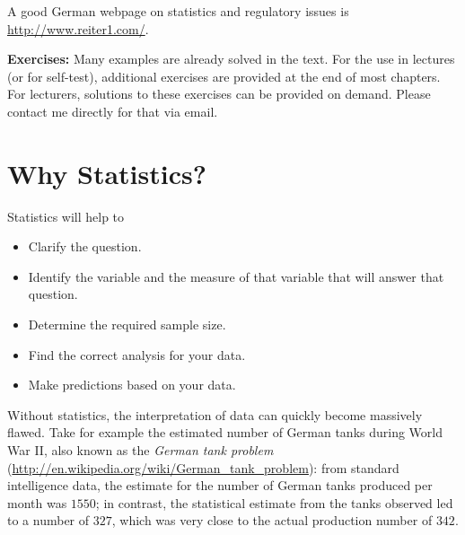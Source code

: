 A good German webpage on statistics and regulatory issues is \url{http://www.reiter1.com/}.

\vspace{5 mm}

\textbf{Exercises: }Many examples are already solved in the text. For the use in lectures (or for self-test), additional exercises are provided at the end of most chapters. For lecturers, solutions to these exercises can be provided on demand. Please contact me directly for that via email.

\section{Why Statistics?}

Statistics will help to
\begin{itemize}
  \item Clarify the question.
  \item Identify the variable and the measure of that variable that will answer that question.
  \item Determine the required sample size.
  \item Find the correct analysis for your data.
  \item Make predictions based on your data.
\end{itemize}

Without statistics, the interpretation of data can quickly become massively flawed. Take for example the estimated number of German tanks during World War II, also known as the \emph{German tank problem} (\url{http://en.wikipedia.org/wiki/German_tank_problem}): from standard intelligence data, the estimate for the number of German tanks produced per month was $1550$; in contrast, the statistical estimate from the tanks observed led to a number of $327$, which was very close to the actual production number of $342$.
